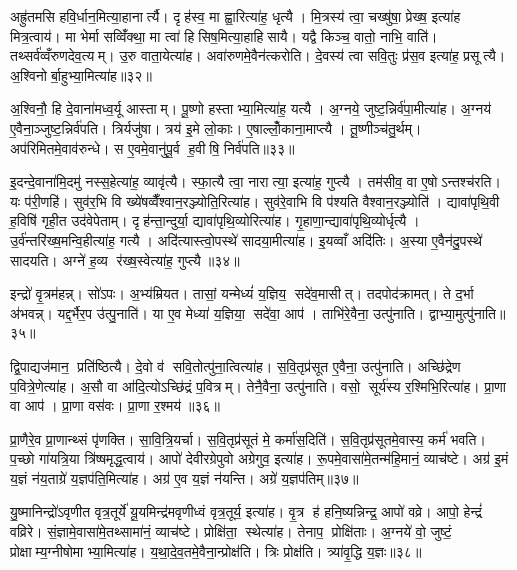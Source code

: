 अह्रु॑तमसि हवि॒र्धान॒मित्या॒हानार्त्यै। दृह॑स्व॒ मा ह्वा॒रित्या॑ह॒ धृत्यै। मि॒त्रस्य॑ त्वा॒ चख्षु॑षा॒ प्रेख्ष॒ इत्या॑ह मित्र॒त्वाय॑। मा भेर्मा सव्विँ॑क्था॒ मा त्वा॑ हिसिष॒मित्या॒हाहिसायै। यद्वै किञ्च॒ वातो॒ नाभि॒ वाति॑। तथ्सर्व॑व्वँरुणदेव॒त्यम्। उ॒रु वाता॒येत्या॑ह। अवा॑रुणमे॒वैन॑त्करोति। दे॒वस्य॑ त्वा सवि॒तुः प्र॑स॒व इत्या॑ह॒ प्रसूत्यै। अ॒श्विनोर्बा॒हुभ्या॒मित्या॑ह॥३२॥

अ॒श्विनौ॒ हि दे॒वाना॑मध्व॒र्यू आस्ताम्। पू॒ष्णो हस्ताभ्या॒मित्या॑ह॒ यत्यै। अ॒ग्नये॒ जुष्ट॒न्निर्व॑पा॒मीत्या॑ह। अ॒ग्नय॑ ए॒वैना॒ञ्जुष्ट॒न्निर्व॑पति। त्रिर्यजु॑षा। त्रय॑ इ॒मे लो॒काः। ए॒षाल्लोँ॒काना॒माप्त्यै। तू॒ष्णीञ्च॑तु॒र्थम्। अप॑रिमितमे॒वाव॑रुन्धे। स ए॒वमे॒वानु॑पू॒र्व ह॒वीषि॒ निर्व॑पति॥३३॥

इ॒दन्दे॒वाना॑मि॒दमु॑ नस्स॒हेत्या॑ह॒ व्यावृ॑त्यै। स्फा॒त्यै त्वा॒ नारात्या॒ इत्या॑ह॒ गुप्त्यै। तम॑सीव॒ वा ए॒षोऽन्तश्च॑रति। यः प॑री॒णहि॑। सुव॑र॒भि वि ख्ये॑षव्वैँश्वान॒रञ्ज्योति॒रित्या॑ह। सुव॑रे॒वाभि वि प॑श्यति वैश्वान॒रञ्ज्योति॑। द्यावा॑पृथि॒वी ह॒विषि॑ गृही॒त उद॑वेपेताम्। दृह॑न्ता॒न्दुर्या॒ द्यावा॑पृथि॒व्योरित्या॑ह। गृ॒हाणा॒न्द्यावा॑पृथि॒व्योर्धृत्यै। उ॒र्व॑न्तरि॑ख्ष॒मन्वि॒हीत्या॑ह॒ गत्यै। अदि॑त्यास्त्वो॒पस्थे॑ सादया॒मीत्या॑ह। इ॒यव्वाँ अदि॑तिः। अ॒स्या ए॒वैन॑दु॒पस्थे॑ सादयति। अग्ने॑ ह॒व्य र॑ख्ष॒स्वेत्या॑ह॒ गुप्त्यै॥३४॥\anuvakamend[य॒ज्ञो वा आपो॒ धाम॑ प्र॒णीय॒ प्रच॑रत्यती॒यादे॒तद्बा॒हुभ्या॒मित्या॑ह ह॒वीषि॒ निर्व॑पति॒ गत्यै॑ च॒त्वारि॑ च]

इन्द्रो॑ वृ॒त्रम॑हन्न्। सो॑ऽपः। अ॒भ्य॑म्रियत। तासां॒ यन्मेध्यं॑ य॒ज्ञिय॒ सदे॑व॒मासीत्। तदपोद॑क्रामत्। ते द॒र्भा अ॑भवन्न्। यद्द॒र्भैर॒प उ॑त्पु॒नाति॑। या ए॒व मेध्या॑ य॒ज्ञिया॒ सदे॑वा॒ आप॑। ताभि॑रे॒वैना॒ उत्पु॑नाति। द्वाभ्या॒मुत्पु॑नाति॥३५॥

द्वि॒पाद्यज॑मान॒ प्रति॑ष्ठित्यै। दे॒वो व॑ सवि॒तोत्पु॑ना॒त्वित्या॑ह। स॒वि॒तृप्र॑सूत ए॒वैना॒ उत्पु॑नाति। अच्छि॑द्रेण प॒वित्रे॒णेत्या॑ह। अ॒सौ वा आ॑दि॒त्योऽच्छि॑द्रं प॒वित्रम्। तेनै॒वैना॒ उत्पु॑नाति। वसो॒ सूर्य॑स्य र॒श्मिभि॒रित्या॑ह। प्रा॒णा वा आप॑। प्रा॒णा वस॑वः। प्रा॒णा र॒श्मय॑॥३६॥

प्रा॒णैरे॒व प्रा॒णान्थ्सं पृ॑णक्ति। सा॒वि॒त्रि॒यर्चा। स॒वि॒तृप्र॑सूतं मे॒ कर्मा॑स॒दिति॑। स॒वि॒तृप्र॑सूतमे॒वास्य॒ कर्म॑ भवति। प॒च्छो गा॑यत्रि॒या त्रि॑ष्षमृद्ध॒त्वाय॑। आपो॑ देवीरग्रेपुवो अग्रेगुव॒ इत्या॑ह। रू॒पमे॒वासा॑मे॒तन्म॑हि॒मानं॒ व्याच॑ष्टे। अग्र॑ इ॒मं य॒ज्ञं न॑य॒ताग्रे॑ य॒ज्ञप॑ति॒मित्या॑ह। अग्र॑ ए॒व य॒ज्ञं न॑यन्ति। अग्रे॑ य॒ज्ञप॑तिम्॥३७॥

यु॒ष्मानिन्द्रो॑ऽवृणीत वृत्र॒तूर्ये॑ यू॒यमिन्द्र॑मवृणीध्वं वृत्र॒तूर्य॒ इत्या॑ह। वृ॒त्र ह॑ हनि॒ष्यन्निन्द्र॒ आपो॑ वव्रे। आपो॒ हेन्द्रं॑ वव्रिरे। सं॒ज्ञामे॒वासा॑मे॒तथ्सामा॑नं॒ व्याच॑ष्टे। प्रोक्षि॑ता॒ स्थेत्या॑ह। तेनाप॒ प्रोक्षि॑ताः। अ॒ग्नये॑ वो॒ जुष्टं॒ प्रोक्षाम्य॒ग्नीषोमाभ्या॒मित्या॑ह। य॒था॒दे॒व॒तमे॒वैना॒न्प्रोक्ष॑ति। त्रिः प्रोक्ष॑ति। त्र्या॑वृ॒द्धि य॒ज्ञः॥३८॥

